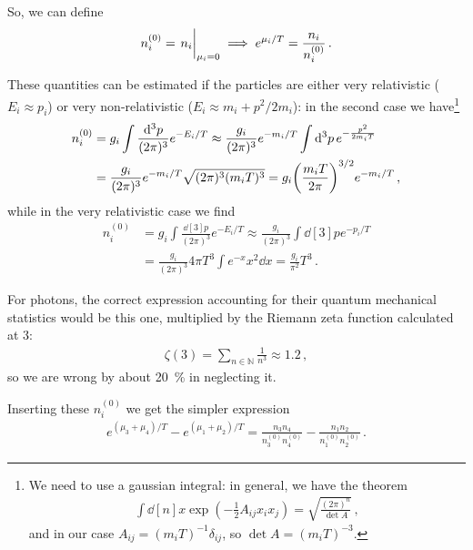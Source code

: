 \documentclass[main.tex]{subfiles}
\begin{document}
So, we can define 
%
\begin{align}
n_{i}^{(0)} = \eval{n_{i}}_{\mu_{i} = 0 }
\implies 
e^{\mu_i / T} = \frac{n_i}{n_i^{(0)}}
\,.
\end{align}

These quantities can be estimated if the particles are either very relativistic (\(E_i \approx p_i\)) or very non-relativistic (\(E_i \approx m_i + p^2 / 2 m_i\)): in the second case we have\footnote{We need to use a gaussian integral: in general, we have the theorem 
%
\begin{align}
\int \dd[n]{x} \exp(- \frac{1}{2} A_{ij} x_{i} x_{j}) = \sqrt{\frac{(2\pi )^{n}}{\det A}}
\,,
\end{align}
%
and in our case \(A_{ij} =  (m_i T)^{-1} \delta_{ij}\), so \(\det A = (m_i T)^{-3}\).
}
%
\begin{align}
n_{i}^{(0)}  
&= g_i \int \frac{ \dd[3]{p}}{(2 \pi)^3} e^{-E_i / T}
\approx \frac{g_i}{(2 \pi)^3} e^{-m_i / T} \int \dd[3]{p} e^{- \frac{p^2}{2m_i T}} \\
&= \frac{g_i}{(2 \pi)^3} e^{-m_i / T} \sqrt{(2 \pi)^3 (m_i T)^3}  
= g_i \qty(\frac{m_i T}{2 \pi })^{3/2} e^{-m_i / T}
\,,
\end{align}
%
while in the very relativistic case we find 
%
\begin{align}
n_{i}^{(0)}  
&= g_i \int \frac{ \dd[3]{p}}{(2 \pi)^3} e^{-E_i / T}
\approx \frac{g_i}{(2 \pi)^3} \int \dd[3]{p} e^{- p_i / T}  \\
&= \frac{g_i}{(2\pi )^3} 4 \pi T^3 \int e^{-x} x^2 \dd{x}  
= \frac{g_i}{\pi^2} T^3
\,.
\end{align}

For photons, the correct expression accounting for their quantum mechanical statistics would be this one, multiplied by the Riemann zeta function calculated at \(3\): 
%
\begin{align}
\zeta (3) = \sum _{n \in \mathbb{N} } \frac{1}{n^3} \approx 1.2
\,,
\end{align}
%
so we are wrong by about \SI{20}{\percent} in neglecting it. 

Inserting these \(n_i^{(0)}\) we get the simpler expression
%
\begin{align}
e^{(\mu_3 + \mu_4 ) / T} - e^{( \mu_1 + \mu_2 ) / T} 
=
\frac{n_3 n_4 }{n_3^{(0)} n_4^{(0)}}
- 
\frac{n_1 n_2 }{n_1^{(0)} n_2^{(0)}}
\,.
\end{align}
\end{document}
